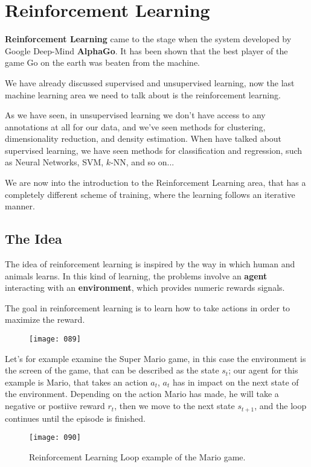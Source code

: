 \chapter{Reinforcement Learning}
\textbf{Reinforcement Learning} came to the stage when the system developed by Google Deep-Mind \textbf{AlphaGo}. It has been shown that the best player of the game Go on the earth was beaten from the machine.

We have already discussed supervised and unsupervised learning, now the last machine learning area we need to talk about is the reinforcement learning.

As we have seen, in unsupervised learning we don't have access to any annotations at all for our data, and we've seen methods for clustering, dimensionality reduction, and density estimation. When have talked about supervised learning, we have seen methods for classification and regression, such as Neural Networks, SVM, \(k\)-NN, and so on...

We are now into the introduction to the Reinforcement Learning area, that has a completely different scheme of training, where the learning follows an iterative manner.

\section{The Idea}
The idea of reinforcement learning is inspired by the way in which human and animals learns. In this kind of learning, the problems involve an \textbf{agent} interacting with an \textbf{environment}, which provides numeric rewards signals.

The goal in reinforcement learning is to learn how to take actions in order to maximize the reward.

\begin{figure}[t!]
    \centering
    \texttt{[image: 089]}
    \caption{}
    \label{fig:089}
\end{figure}

Let's for example examine the Super Mario game, in this case the environment is the screen of the game, that can be described as the state \(s_t\); our agent for this example is Mario, that takes an action \(a_t\), \(a_t\) has in impact on the next state of the environment. Depending on the action Mario has made, he will take a negative or postiive reward \(r_t\), then we move to the next state \(s_{t+1}\), and the loop continues until the episode is finished.

\begin{figure}[h!]
    \centering
    \texttt{[image: 090]}
    \caption{Reinforcement Learning Loop example of the Mario game.}
    \label{fig:090}
\end{figure}

